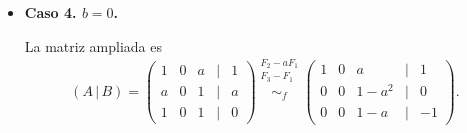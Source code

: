 \documentclass[a4paper,12pt]{article}
\begin{document}
\begin{ejercicio}[title=Ejercicio 31]
\begin{itemize}
\begin{itemize}
Resolvemos aplicando Gauss–Jordan sobre la ampliada con \(b=1\):
\[
(A\,|\,B)
\sim_f
\begin{pmatrix}
1 & 1 & -2 &\Big|& 1\\
0 & 3 & -3 &\Big|& 0\\
0 & 0 & 0 &\Big|& 0
\end{pmatrix}
\overset{\substack{\tfrac{1}{3}F_2\\{}}}{\sim_f}
\begin{pmatrix}
1 & 1 & -2 &\Big|& 1\\
0 & 1 & -1 &\Big|& 0\\
0 & 0 & 0 &\Big|& 0
\end{pmatrix}
\]
\[
\overset{\substack{F_1 - F_2\\{}}}{\sim_f}
\begin{pmatrix}
1 & 0 & -1 &\Big|& 1\\
0 & 1 & -1 &\Big|& 0\\
0 & 0 & 0 &\Big|& 0
\end{pmatrix} = H_f(A\,|\,B) \Rightarrow
\begin{cases}
x - z = 1,\\[4pt]
y - z = 0.
\end{cases}
\]

Tomando \(z=\lambda\in\mathbb{R}\) (parámetro libre) obtenemos
\[
\boxed{\,x = 1+\lambda,\quad y = \lambda,\quad z=\lambda,\qquad \lambda\in\mathbb{R}\,}
\]

\item \textbf{Subcaso 3.2. \(a=-2\) y \(b\neq 1\).}

Aquí \(\operatorname{Rg}(A)=2 \neq \operatorname{Rg}(A\,|\,B)=3\), por lo que el sistema es incompatible.

\[
\boxed{\text{El sistema es un SI si } a=-2 \text{ y } b\neq 1.}
\]
\end{itemize}

\item \textbf{Caso 4. \(b=0\).}

La matriz ampliada es
\[
(A\,|\,B)=
\begin{pmatrix}
1 & 0 & a &\Big|& 1\\
a & 0 & 1 &\Big|& a\\
1 & 0 & 1 &\Big|& 0
\end{pmatrix}
\overset{\substack{F_2-aF_1\\ F_3-F_1\\{}}}{\sim_f}
\begin{pmatrix}
1 & 0 & a &\Big|& 1\\
0 & 0 & 1-a^2 &\Big|& 0\\
0 & 0 & 1-a &\Big|& -1
\end{pmatrix}.
\]


\end{itemize}
\end{ejercicio}
\end{document}
